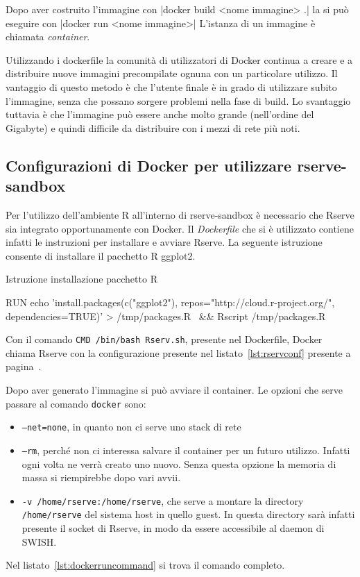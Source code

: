 \documentclass[10pt,titlepage,twoside,a4paper]{report}
\newenvironment{code}{\singlespacing\captionsetup{type=listing}}{}
\begin{document}
Dopo aver costruito l'immagine con |docker build <nome 
immagine> .|
la si può eseguire con |docker run <nome immagine>|
L'istanza di un immagine è chiamata \emph{container}.

Utilizzando i dockerfile la comunità di utilizzatori di Docker continua a 
creare e a distribuire nuove immagini precompilate ognuna con un particolare 
utilizzo.
Il vantaggio di questo metodo è che l'utente finale è in grado di utilizzare 
subito l'immagine, senza che possano sorgere problemi nella fase di build. Lo 
svantaggio tuttavia è che l'immagine può  essere anche molto grande 
(nell'ordine del Gigabyte) e quindi difficile da distribuire con i mezzi di 
rete più noti.

    \subsection{Configurazioni di Docker per utilizzare rserve-sandbox}
Per l'utilizzo dell'ambiente R all'interno di rserve-sandbox è necessario che 
Rserve sia integrato opportunamente con Docker. Il \emph{Dockerfile} che si 
è utilizzato contiene infatti le instruzioni per installare e avviare Rserve.
La seguente istruzione consente di installare il pacchetto R ggplot2.

\begin{code}
    \caption{Istruzione installazione pacchetto R}
    \begin{shellcode*}{}
RUN echo 'install.packages(c("ggplot2"), repos="http://cloud.r-project.org/", dependencies=TRUE)' > /tmp/packages.R \
    && Rscript /tmp/packages.R
    \end{shellcode*}
\end{code}

Con il comando \texttt{CMD /bin/bash Rserv.sh}, presente nel 
Dockerfile,
Docker chiama Rserve con la configurazione presente nel 
listato~\ref{lst:rservconf} presente a pagina~\pageref{lst:rservconf}.

Dopo aver generato l'immagine si può avviare il container.
Le opzioni che serve passare al comando \texttt{docker} sono:
\begin{itemize}
    \item  \texttt{--net=none}, in quanto non ci serve uno stack di rete
    \item  \texttt{--rm}, perché non ci interessa salvare il container per
           un futuro utilizzo. Infatti ogni volta ne verrà creato uno nuovo.
           Senza questa opzione la memoria di massa si riempirebbe dopo
           vari avvii.
    \item  \texttt{-v /home/rserve:/home/rserve}, che serve a montare 
           la directory \texttt{/home/rserve} del sistema host in quello guest.
           In questa directory sarà infatti presente il socket di Rserve,
           in modo da essere accessibile al daemon di SWISH.
\end{itemize}
Nel listato~\ref{lst:dockerruncommand} si trova il comando completo.
\end{document}
